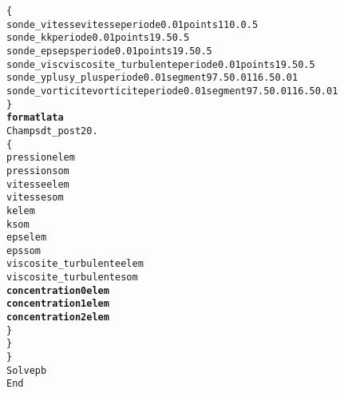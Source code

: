 \begin{alltt}
        \{
            sonde_vitesse vitesse periode 0.01 points 1 10. 0.5
            sonde_k k periode 0.01 points 1 9.5 0.5
            sonde_eps eps periode 0.01 points 1 9.5 0.5
            sonde_visc viscosite_turbulente periode 0.01 points 1 9.5 0.5
            sonde_yplus y_plus periode 0.01 segment 9 7.5 0.01 16.5 0.01
            sonde_vorticite vorticite periode 0.01 segment 9 7.5 0.01 16.5 0.01
        \}
        {\bf{format lata}}
        Champs dt_post 20.
        \{
            pression elem
            pression som
            vitesse elem
            vitesse som
            k elem
            k som
            eps elem
            eps som
            viscosite_turbulente elem
            viscosite_turbulente som
            {\bf{concentration0 elem}}
            {\bf{concentration1 elem}}
            {\bf{concentration2 elem}}
        \}
    \}
\}
Solve pb
End
\end{alltt}

